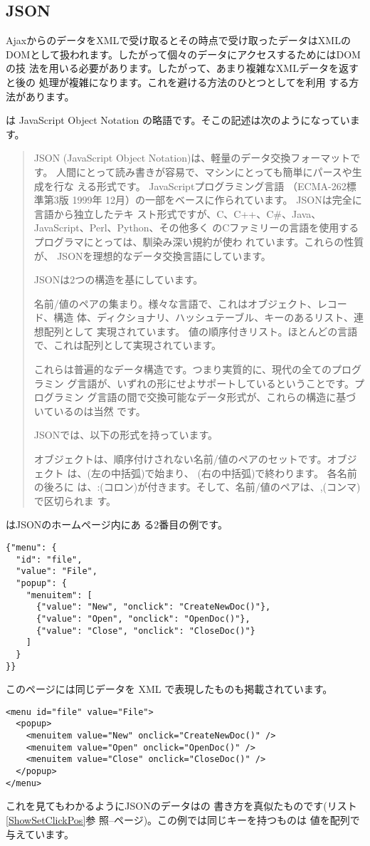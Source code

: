 \subsection{JSON}
AjaxからのデータをXMLで受け取るとその時点で受け取ったデータはXMLの
DOMとして扱われます。したがって個々のデータにアクセスするためにはDOMの技
法を用いる必要があります。したがって、あまり複雑なXMLデータを返すと後の
処理が複雑になります。これを避ける方法のひとつとしてを利用
する方法があります。

は JavaScript
Object Notation の略語です。そこの記述は次のようになっています。
\begin{quotation}
 JSON (JavaScript Object Notation)は、軽量のデータ交換フォーマットです。
 人間にとって読み書きが容易で、マシンにとっても簡単にパースや生成を行な
 える形式です。 JavaScriptプログラミング言語 （ECMA-262標準第3版 1999年
 12月）の一部をベースに作られています。 JSONは完全に言語から独立したテキ
 スト形式ですが、C、C++、C\#、Java、JavaScript、Perl、Python、その他多く
 のCファミリーの言語を使用するプログラマにとっては、馴染み深い規約が使わ
 れています。これらの性質が、 JSONを理想的なデータ交換言語にしています。 

JSONは2つの構造を基にしています。

名前/値のペアの集まり。様々な言語で、これはオブジェクト、レコード、構造
 体、ディクショナリ、ハッシュテーブル、キーのあるリスト、連想配列として
 実現されています。
値の順序付きリスト。ほとんどの言語で、これは配列として実現されています。
 　

これらは普遍的なデータ構造です。つまり実質的に、現代の全てのプログラミン
 グ言語が、いずれの形にせよサポートしているということです。プログラミン
 グ言語の間で交換可能なデータ形式が、これらの構造に基づいているのは当然
 です。

JSONでは、以下の形式を持っています。

オブジェクトは、順序付けされない名前/値のペアのセットです。オブジェクト
は、{(左の中括弧)で始まり、} (右の中括弧)で終わります。 各名前の後ろに
は、:(コロン)が付きます。そして、名前/値のペアは、,(コンマ)で区切られま
す。
\end{quotation}
はJSONのホームページ内にあ
る2番目の例です。
\begin{verbatim}
{"menu": {
  "id": "file",
  "value": "File",
  "popup": {
    "menuitem": [
      {"value": "New", "onclick": "CreateNewDoc()"},
      {"value": "Open", "onclick": "OpenDoc()"},
      {"value": "Close", "onclick": "CloseDoc()"}
    ]
  }
}}
\end{verbatim}
このページには同じデータを XML で表現したものも掲載されています。
\begin{verbatim}
<menu id="file" value="File">
  <popup>
    <menuitem value="New" onclick="CreateNewDoc()" />
    <menuitem value="Open" onclick="OpenDoc()" />
    <menuitem value="Close" onclick="CloseDoc()" />
  </popup>
</menu>
\end{verbatim}
これを見てもわかるようにJSONのデータは\JS の
書き方を真似たものです(リスト\ref{ShowSetClickPos}参
照--\pageref{ShowSetClickPos}ページ)。この例では同じキーを持つものは
値を配列で与えています。

